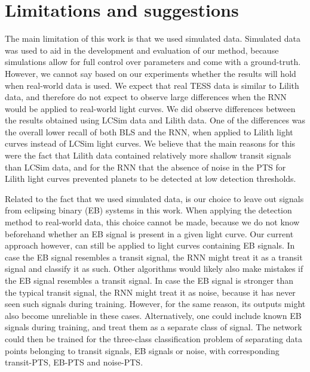 
\section{Limitations and suggestions}

The main limitation of this work is that we used simulated data. Simulated data was used to aid in the development and evaluation of our method,  because simulations allow for full control over parameters and come with a ground-truth. However, we cannot say based on our experiments whether the results will hold when real-world data is used. We expect that real TESS data is similar to Lilith data, and therefore do not expect to observe large differences when the RNN would be applied to real-world light curves. We did observe differences between the results obtained using LCSim data and Lilith data. One of the differences was the overall lower recall of both BLS and the RNN, when applied to Lilith light curves instead of LCSim light curves. We believe that the main reasons for this were the fact that Lilith data contained relatively more shallow transit signals than LCSim data, and for the RNN that the absence of noise in the PTS for Lilith light curves prevented planets to be detected at low detection thresholds. 

Related to the fact that we used simulated data, is our choice to leave out signals from eclipsing binary (EB) systems in this work. When applying the detection method to real-world data, this choice cannot be made, because we do not know beforehand whether an EB signal is present in a given light curve. Our current approach however, can still be applied to  light curves containing EB signals. In case the EB signal resembles a transit signal, the RNN might treat it as a transit signal and classify it as such. Other algorithms would likely also make mistakes if the EB signal resembles a transit signal. In case the EB signal is stronger than the typical transit signal, the RNN might treat it as noise, because it has never seen such signals during training. However, for the same reason, its outputs might also become unreliable in these cases. Alternatively, one could include known EB signals during training, and treat them as a separate class of signal. The network could then be trained for the three-class classification problem of separating data points belonging to transit signals, EB signals or noise, with corresponding transit-PTS, EB-PTS and noise-PTS.


